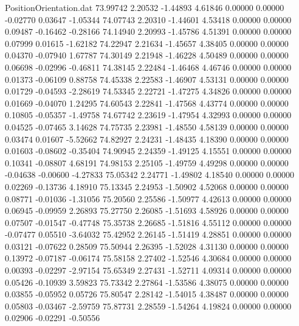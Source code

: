 \begin{filecontents}{PositionOrientation.dat}
  73.99742    2.20532   -1.44893     4.61846    0.00000    0.00000   -0.02770    0.03647   -1.05344
  74.07743    2.20310   -1.44601     4.53418    0.00000    0.00000    0.09487   -0.16462   -0.28166
  74.14940    2.20993   -1.45786     4.51391    0.00000    0.00000    0.07999    0.01615   -1.62182
  74.22947    2.21634   -1.45657     4.38405    0.00000    0.00000    0.04370   -0.07940    1.67787
  74.30149    2.21948   -1.46228     4.50489    0.00000    0.00000    0.06698   -0.02996   -0.46811
  74.38145    2.22484   -1.46468     4.46746    0.00000    0.00000    0.01373   -0.06109    0.88758
  74.45338    2.22583   -1.46907     4.53131    0.00000    0.00000    0.01729   -0.04593   -2.28619
  74.53345    2.22721   -1.47275     4.34826    0.00000    0.00000    0.01669   -0.04070    1.24295
  74.60543    2.22841   -1.47568     4.43774    0.00000    0.00000    0.10805   -0.05357   -1.49758
  74.67742    2.23619   -1.47954     4.32993    0.00000    0.00000    0.04525   -0.07465    3.14628
  74.75735    2.23981   -1.48550     4.58139    0.00000    0.00000    0.03474    0.01607   -5.52662
  74.82927    2.24231   -1.48435     4.18390    0.00000    0.00000    0.01603   -0.08602   -0.35404
  74.90945    2.24359   -1.49125     4.15551    0.00000    0.00000    0.10341   -0.08807    4.68191
  74.98153    2.25105   -1.49759     4.49298    0.00000    0.00000   -0.04638   -0.00600   -4.27833
  75.05342    2.24771   -1.49802     4.18540    0.00000    0.00000    0.02269   -0.13736    4.18910
  75.13345    2.24953   -1.50902     4.52068    0.00000    0.00000    0.08771   -0.01036   -1.31056
  75.20560    2.25586   -1.50977     4.42613    0.00000    0.00000    0.06945   -0.09959    2.26893
  75.27750    2.26085   -1.51693     4.58926    0.00000    0.00000    0.07507   -0.01547   -0.47748
  75.35738    2.26685   -1.51816     4.55112    0.00000    0.00000   -0.07477    0.05510   -3.64032
  75.42952    2.26145   -1.51419     4.28851    0.00000    0.00000    0.03121   -0.07622    0.28509
  75.50944    2.26395   -1.52028     4.31130    0.00000    0.00000    0.13972   -0.07187   -0.06174
  75.58158    2.27402   -1.52546     4.30684    0.00000    0.00000    0.00393   -0.02297   -2.97154
  75.65349    2.27431   -1.52711     4.09314    0.00000    0.00000    0.05426   -0.10939    3.59823
  75.73342    2.27864   -1.53586     4.38075    0.00000    0.00000    0.03855   -0.05952    0.05726
  75.80547    2.28142   -1.54015     4.38487    0.00000    0.00000    0.05803   -0.03467   -2.59759
  75.87731    2.28559   -1.54264     4.19824    0.00000    0.00000    0.02906   -0.02291   -0.50556

\end{filecontents}
